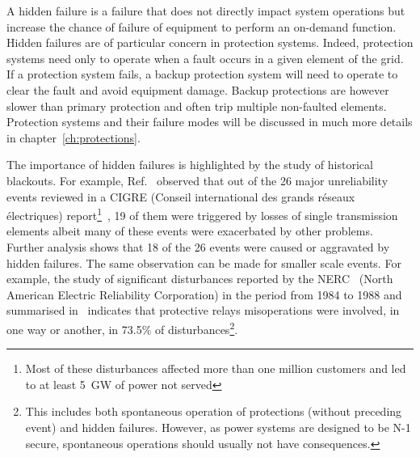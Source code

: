 
A hidden failure is a failure that does not directly impact system operations but increase the chance of failure of equipment to perform an on-demand function. Hidden failures are of particular concern in protection systems. Indeed, protection systems need only to operate when a fault occurs in a given element of the grid. If a protection system fails, a backup protection system will need to operate to clear the fault and avoid equipment damage. Backup protections are however slower than primary protection and often trip multiple non-faulted elements. Protection systems and their failure modes will be discussed in much more details in chapter~\ref{ch:protections}.


The importance of hidden failures is highlighted by the study of historical blackouts. For example, Ref.~\cite{CascadingMethodoAndChallenges} observed that out of the 26 major unreliability events reviewed in a CIGRE (Conseil international des grands réseaux électriques) report\footnote{Most of these disturbances affected more than one million customers and led to at least 5~GW of power not served}~\cite{majorBlackouts}, 19 of them were triggered by losses of single transmission elements albeit many of these events were exacerbated by other problems. Further analysis shows that 18 of the 26 events were caused or aggravated by hidden failures. The same observation can be made for smaller scale events. For example, the study of significant disturbances reported by the NERC~\cite{NERCDisturbancesReport} (North American Electric Reliability Corporation) in the period from 1984 to 1988 and summarised in~\cite{ZoneVulnerability} indicates that protective relays misoperations were involved, in one way or another, in 73.5\% of disturbances\footnote{This includes both spontaneous operation of protections (without preceding event) and hidden failures. However, as power systems are designed to be N-1 secure, spontaneous operations should usually not have consequences.}.

